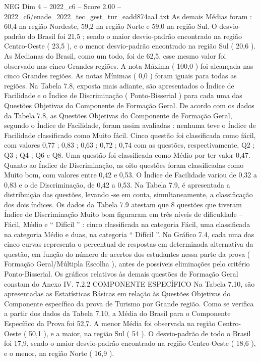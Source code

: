 \begin{textsample}{NEG Dim 4 – 2022\_c6 – Score 2.00 – 2022\_c6/enade\_2022\_tec\_gest\_tur\_eadd874aa1.txt}
As demais Médias foram : 60,4 na região Nordeste, 59,2 na região Norte e 59,0 na região Sul.
O desvio-padrão do Brasil foi 21,5 ; sendo o maior desvio-padrão encontrado na região Centro-Oeste ( 23,5 ), e o menor desvio-padrão encontrado na região Sul ( 20,6 ).
As Medianas do Brasil, como um todo, foi de 62,5, esse mesmo valor foi observado nas cinco Grandes regiões.
A nota Máxima ( 100,0 ) foi alcançada nas cinco Grandes regiões.
As notas Mínimas ( 0,0 ) foram iguais para todas as regiões.
Na Tabela 7.8, exposta mais adiante, são apresentados o Índice de Facilidade e o Índice de Discriminação ( Ponto-Bisserial ) para cada uma das Questões Objetivas do Componente de Formação Geral.
De acordo com os dados da Tabela 7.8, as Questões Objetivas do Componente de Formação Geral, segundo o Índice de Facilidade, foram assim avaliadas : nenhuma teve o Índice de Facilidade classificado como Muito fácil.
Cinco questão foi classificada como fácil, com valores 0,77 ; 0,83 ; 0,63 ; 0,72 ; 0,74 com as questões, respectivamente, Q2 ; Q3 ; Q4 ; Q6 e Q8.
Uma questão foi classificada como Médio por ter valor 0,47.
Quanto ao Índice de Discriminação, as oito questões foram classificadas como Muito bom, com valores entre 0,42 e 0,53.
O Índice de Facilidade variou de 0,32 a 0,83 e o de Discriminação, de 0,42 a 0,53.
Na Tabela 7.9, é apresentada a distribuição das questões, levando -se em conta, simultaneamente, a classificação dos dois índices.
Os dados da Tabela 7.9 atestam que 8 questões que tiveram Índice de Discriminação Muito bom figuraram em três níveis de dificuldade – Fácil, Médio e “ Difícil ” : cinco classificada na categoria Fácil, uma classificada na categoria Médio e duas, na categoria “ Difícil ”.
No Gráfico 7.4, cada uma das cinco curvas representa o percentual de respostas em determinada alternativa da questão, em função do número de acertos dos estudantes nessa parte da prova ( Formação Geral/Múltipla Escolha ), antes de possíveis eliminações pelo critério Ponto-Bisserial.
Os gráficos relativos às demais questões de Formação Geral constam do Anexo IV. 7.2.2 COMPONENTE ESPECÍFICO Na Tabela 7.10, são apresentadas as Estatísticas Básicas em relação às Questões Objetivas do Componente específico da prova de Turismo por Grande região.
Como se verifica a partir dos dados da Tabela 7.10, a Média do Brasil para o Componente Específico da Prova foi 52,7.
A menor Média foi observada na região Centro-Oeste ( 50,1 ), e a maior, na região Sul ( 54 ).
O desvio-padrão de todo o Brasil foi 17,9, sendo o maior desvio-padrão encontrado na região Centro-Oeste ( 18,6 ), e o menor, na região Norte ( 16,9 ).

\end{textsample}
